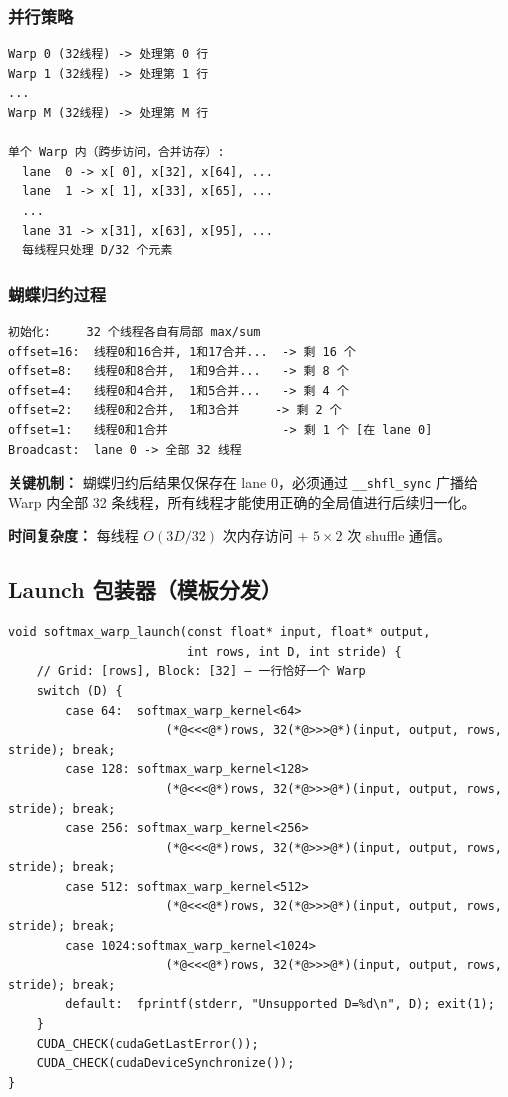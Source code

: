 \documentclass[12pt,a4paper]{ctexart}
\begin{document}
\subsubsection{并行策略}

\begin{verbatim}
Warp 0 (32线程) -> 处理第 0 行
Warp 1 (32线程) -> 处理第 1 行
...
Warp M (32线程) -> 处理第 M 行

单个 Warp 内（跨步访问，合并访存）:
  lane  0 -> x[ 0], x[32], x[64], ...
  lane  1 -> x[ 1], x[33], x[65], ...
  ...
  lane 31 -> x[31], x[63], x[95], ...
  每线程只处理 D/32 个元素
\end{verbatim}

\subsubsection{蝴蝶归约过程}

\begin{verbatim}
初始化:     32 个线程各自有局部 max/sum
offset=16:  线程0和16合并, 1和17合并...  -> 剩 16 个
offset=8:   线程0和8合并,  1和9合并...   -> 剩 8 个
offset=4:   线程0和4合并,  1和5合并...   -> 剩 4 个
offset=2:   线程0和2合并,  1和3合并     -> 剩 2 个
offset=1:   线程0和1合并                -> 剩 1 个 [在 lane 0]
Broadcast:  lane 0 -> 全部 32 线程
\end{verbatim}

\textbf{关键机制：} 蝴蝶归约后结果仅保存在 lane 0，必须通过 \texttt{\_\_shfl\_sync} 广播给 Warp 内全部 32 条线程，所有线程才能使用正确的全局值进行后续归一化。

\textbf{时间复杂度：} 每线程 $O(3D/32)$ 次内存访问 + $5 \times 2$ 次 shuffle 通信。

\subsection{Launch 包装器（模板分发）}

\begin{lstlisting}[style=cuda, caption={Launch Wrapper}]
void softmax_warp_launch(const float* input, float* output,
                         int rows, int D, int stride) {
    // Grid: [rows], Block: [32] — 一行恰好一个 Warp
    switch (D) {
        case 64:  softmax_warp_kernel<64>
                      (*@<<<@*)rows, 32(*@>>>@*)(input, output, rows, stride); break;
        case 128: softmax_warp_kernel<128>
                      (*@<<<@*)rows, 32(*@>>>@*)(input, output, rows, stride); break;
        case 256: softmax_warp_kernel<256>
                      (*@<<<@*)rows, 32(*@>>>@*)(input, output, rows, stride); break;
        case 512: softmax_warp_kernel<512>
                      (*@<<<@*)rows, 32(*@>>>@*)(input, output, rows, stride); break;
        case 1024:softmax_warp_kernel<1024>
                      (*@<<<@*)rows, 32(*@>>>@*)(input, output, rows, stride); break;
        default:  fprintf(stderr, "Unsupported D=%d\n", D); exit(1);
    }
    CUDA_CHECK(cudaGetLastError());
    CUDA_CHECK(cudaDeviceSynchronize());
}
\end{lstlisting}
\end{document}
